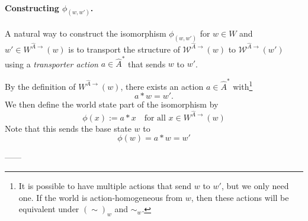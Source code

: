 \paragraph{Constructing $\phi_{(w,w')}$.}

A natural way to construct the isomorphism $\phi_{(w,w')}$ for $w \in W$ and $w' \in W^{\hat{A}\to}(w)$ is to transport the structure of $\mathscr{W}^{\hat{A}\to}(w)$ to $\mathscr{W}^{\hat{A}\to}(w')$ using a \emph{transporter action} $a \in \hat{A}^{*}$ that sends $w$ to $w'$.

By the definition of $W^{\hat{A}\to}(w)$, there exists an action $a \in \hat{A}^{*}$ with\footnote{
It is possible to have multiple actions that send $w$ to $w'$, but we only need one.
If the world is action-homogeneous from $w$, then these actions will be equivalent under $(\sim)_{w}$ and $\sim_{w}$.
}
\begin{equation}
    a \ast w = w'.
\end{equation}
We then define the world state part of the isomorphism by
\begin{equation}
    \phi(x) := a \ast x \quad \text{for all $x \in W^{\hat{A}\to}(w)$}
\end{equation}
Note that this sends the base state $w$ to
\begin{equation}
    \phi(w) = a \ast w = w'
\end{equation}


------


